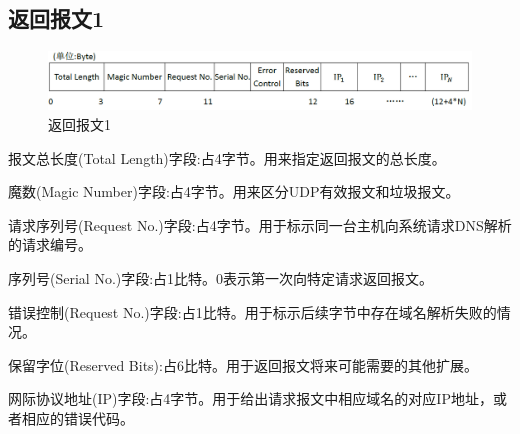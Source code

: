 \subsection{返回报文1}
\begin{figure}[H]
\centering
\includegraphics[keepaspectratio,scale=0.4]{pitures/response1.png}
\caption{返回报文1}
\end{figure}
	\begin{asparaitem}
		\item{报文总长度(Total Length)字段:占4字节。用来指定返回报文的总长度。}
		\item{魔数(Magic Number)字段:占4字节。用来区分UDP有效报文和垃圾报文。}
		\item{请求序列号(Request No.)字段:占4字节。用于标示同一台主机向系统请求DNS解析的请求编号。}
		\item{序列号(Serial No.)字段:占1比特。0表示第一次向特定请求返回报文。}
		\item{错误控制(Request No.)字段:占1比特。用于标示后续字节中存在域名解析失败的情况。}
		\item{保留字位(Reserved Bits):占6比特。用于返回报文将来可能需要的其他扩展。}
		\item{网际协议地址(IP)字段:占4字节。用于给出请求报文中相应域名的对应IP地址，或者相应的错误代码。}
	\end{asparaitem}

